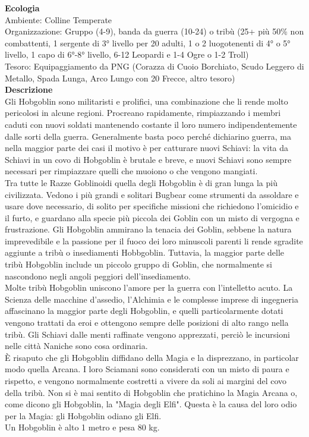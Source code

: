\begin{multicols}{2}
\textbf{Ecologia}\\
Ambiente: Colline Temperate\\
Organizzazione: Gruppo (4-9), banda da guerra (10-24) o tribù (25+ più 50\% non combattenti, 1 sergente di 3° livello per 20 adulti, 1 o 2 luogotenenti di 4° o 5° livello, 1 capo di 6°-8° livello, 6-12 Leopardi e 1-4 Ogre o 1-2 Troll)\\
Tesoro: Equipaggiamento da PNG (Corazza di Cuoio Borchiato, Scudo Leggero di Metallo, Spada Lunga, Arco Lungo con 20 Frecce, altro tesoro)\\
\textbf{Descrizione}\\
Gli Hobgoblin sono militaristi e prolifici, una combinazione che li rende molto pericolosi in alcune regioni. Procreano rapidamente, rimpiazzando i membri caduti con nuovi soldati mantenendo costante il loro numero indipendentemente dalle sorti della guerra. Generalmente basta poco perché dichiarino guerra, ma nella maggior parte dei casi il motivo è per catturare nuovi Schiavi: la vita da Schiavi in un covo di Hobgoblin è brutale e breve, e nuovi Schiavi sono sempre necessari per rimpiazzare quelli che muoiono o che vengono mangiati.\\
Tra tutte le Razze Goblinoidi quella degli Hobgoblin è di gran lunga la più civilizzata.
Vedono i più grandi e solitari Bugbear come strumenti da assoldare e usare dove necessario, di solito per specifiche missioni che richiedono l'omicidio e il furto, e guardano alla specie più piccola dei Goblin con un misto di vergogna e frustrazione. Gli Hobgoblin ammirano la tenacia dei Goblin, sebbene la natura imprevedibile e la passione per il fuoco dei loro minuscoli parenti li rende sgradite aggiunte a tribù o insediamenti Hobbgoblin. Tuttavia, la maggior parte delle tribù Hobgoblin include un piccolo gruppo di Goblin, che normalmente si nascondono negli angoli peggiori dell'insediamento.\\
Molte tribù Hobgoblin uniscono l'amore per la guerra con l'intelletto acuto. La Scienza delle macchine d'assedio, l'Alchimia e le complesse imprese di ingegneria affascinano la maggior parte degli Hobgoblin, e quelli particolarmente dotati vengono trattati da eroi e ottengono sempre delle posizioni di alto rango nella tribù. Gli Schiavi dalle menti raffinate vengono apprezzati, perciò le incursioni nelle città Naniche sono cosa ordinaria.\\
È risaputo che gli Hobgoblin diffidano della Magia e la disprezzano, in particolar modo quella Arcana. I loro Sciamani sono considerati con un misto di paura e rispetto, e vengono normalmente costretti a vivere da soli ai margini del covo della tribù. Non si è mai sentito di Hobgoblin che pratichino la Magia Arcana o, come dicono gli Hobgoblin, la "Magia degli Elfi". Questa è la causa del loro odio per la Magia: gli Hobgoblin odiano gli Elfi.\\
Un Hobgoblin è alto 1 metro e pesa 80 kg.\\




\end{multicols}
